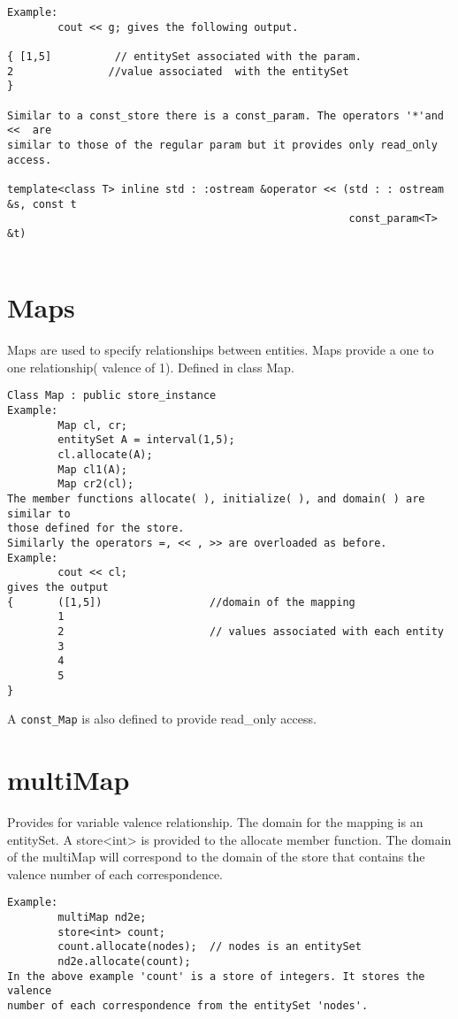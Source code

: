 \documentclass[letterpaper,12pt]{article}
\begin{document}
\begin{verbatim}
Example: 
        cout << g; gives the following output.

{ [1,5]          // entitySet associated with the param.
2               //value associated  with the entitySet
}

Similar to a const_store there is a const_param. The operators '*'and  <<  are 
similar to those of the regular param but it provides only read_only access.

template<class T> inline std : :ostream &operator << (std : : ostream &s, const t        
                                                      const_param<T> &t)


\end{verbatim}

\section{Maps}

Maps are used to specify relationships between entities. Maps provide a one to 
one relationship( valence of 1). Defined in class Map. 
\begin{verbatim}
Class Map : public store_instance
Example: 
        Map cl, cr; 
        entitySet A = interval(1,5);
        cl.allocate(A);
        Map cl1(A);
        Map cr2(cl);
The member functions allocate( ), initialize( ), and domain( ) are similar to 
those defined for the store. 
Similarly the operators =, << , >> are overloaded as before.
Example:
        cout << cl;
gives the output 
{       ([1,5])                 //domain of the mapping
        1
        2                       // values associated with each entity
        3
        4
        5
}
\end{verbatim}
A {\tt const\_Map} is also defined to provide read\_only access.


\section{multiMap}
Provides for variable valence relationship. The domain for the mapping is an 
entitySet. A store<int> is provided to the allocate member function. The domain 
of the multiMap will correspond to the domain of the store that contains the 
valence number of each correspondence.
\begin{verbatim}
Example:
        multiMap nd2e;
        store<int> count;
        count.allocate(nodes);  // nodes is an entitySet
        nd2e.allocate(count);
In the above example 'count' is a store of integers. It stores the valence 
number of each correspondence from the entitySet 'nodes'.  
\end{verbatim}
\end{document}
